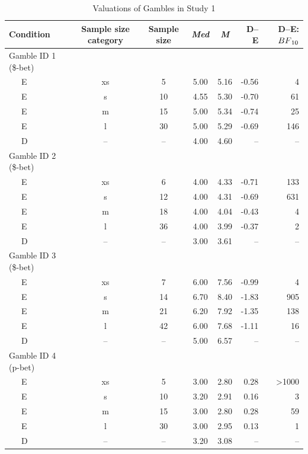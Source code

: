 \documentclass[a4paper, man, floatsintext]{apa6}
\begin{document}
\begin{table}[tbp]

\begin{center}
\begin{threeparttable}

\caption{\label{tab:means_study1}Valuations of Gambles in Study 1}

\begin{tabular}{lccccrr}
\toprule
Condition & Sample size category & Sample size & \textit{Med} & \textit{M} & D--E & D--E:$BF\textsubscript{10}$\\
\midrule
Gamble ID 1 (\$-bet) &  &  &  &  &  & \\
\ \ \ E & xs & 5 & 5.00 & 5.16 & -0.56 & 4\\
\ \ \ E & s & 10 & 4.55 & 5.30 & -0.70 & 61\\
\ \ \ E & m & 15 & 5.00 & 5.34 & -0.74 & 25\\
\ \ \ E & l & 30 & 5.00 & 5.29 & -0.69 & 146\\
\ \ \ D & -- & -- & 4.00 & 4.60 & -- & --\\
Gamble ID 2 (\$-bet) &  &  &  &  &  & \\
\ \ \ E & xs & 6 & 4.00 & 4.33 & -0.71 & 133\\
\ \ \ E & s & 12 & 4.00 & 4.31 & -0.69 & 631\\
\ \ \ E & m & 18 & 4.00 & 4.04 & -0.43 & 4\\
\ \ \ E & l & 36 & 4.00 & 3.99 & -0.37 & 2\\
\ \ \ D & -- & -- & 3.00 & 3.61 & -- & --\\
Gamble ID 3 (\$-bet) &  &  &  &  &  & \\
\ \ \ E & xs & 7 & 6.00 & 7.56 & -0.99 & 4\\
\ \ \ E & s & 14 & 6.70 & 8.40 & -1.83 & 905\\
\ \ \ E & m & 21 & 6.20 & 7.92 & -1.35 & 138\\
\ \ \ E & l & 42 & 6.00 & 7.68 & -1.11 & 16\\
\ \ \ D & -- & -- & 5.00 & 6.57 & -- & --\\
Gamble ID 4 (p-bet) &  &  &  &  &  & \\
\ \ \ E & xs & 5 & 3.00 & 2.80 & 0.28 & >1000\\
\ \ \ E & s & 10 & 3.20 & 2.91 & 0.16 & 3\\
\ \ \ E & m & 15 & 3.00 & 2.80 & 0.28 & 59\\
\ \ \ E & l & 30 & 3.00 & 2.95 & 0.13 & 1\\
\ \ \ D & -- & -- & 3.20 & 3.08 & -- & --\\

\end{tabular}
\end{threeparttable}
\end{center}
\end{table}
\end{document}
